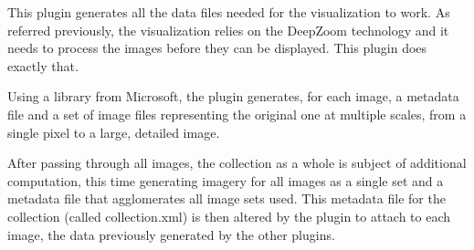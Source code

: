 This plugin generates all the data files needed for the visualization to work. As referred previously, the visualization relies on the DeepZoom technology and it needs to process the images before they can be displayed. This plugin does exactly that.


Using a library from Microsoft, the plugin generates, for each image, a metadata file and a set of image files representing the original one at multiple scales, from a single pixel to a large, detailed image.

After passing through all images, the collection as a whole is subject of additional computation, this time generating imagery for all images as a single set and a metadata file that agglomerates all image sets used. This metadata file for the collection (called collection.xml) is then altered by the plugin to attach to each image, the data previously generated by the other plugins.

